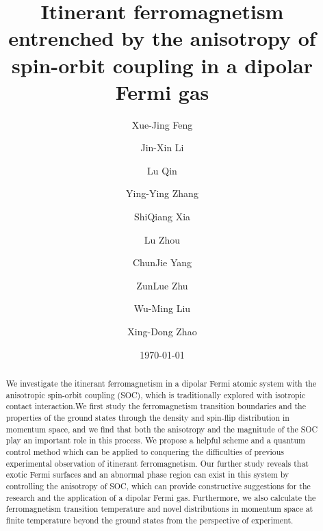\documentclass[twocolumn,english,pra,superscriptaddress]{revtex4-1}
\begin{document}
\title{\Large\textbf{Itinerant ferromagnetism entrenched by the anisotropy of spin-orbit coupling in a dipolar Fermi gas}}
\author{Xue-Jing Feng}
\author{Jin-Xin Li}
\author{Lu Qin}
\author{Ying-Ying Zhang}
\author{ShiQiang Xia}
\author{Lu Zhou}
\author{ChunJie Yang}
\author{ZunLue Zhu}
\author{Wu-Ming Liu}
\author{Xing-Dong Zhao}

\begin{abstract}
We investigate the itinerant ferromagnetism in a dipolar Fermi atomic system with the anisotropic spin-orbit coupling (SOC), which is traditionally explored with isotropic contact interaction.We first study the ferromagnetism transition boundaries and the properties of the ground states through the density and spin-flip distribution in momentum space, and we find that both the anisotropy and the magnitude of the SOC play an important role in this process. We propose a helpful scheme and a quantum control method which can be applied to conquering the difficulties of previous experimental observation of itinerant ferromagnetism. Our further study reveals that exotic Fermi surfaces and an abnormal phase region can exist in this system by controlling the anisotropy of SOC, which can provide constructive suggestions for the research and the application of a dipolar Fermi gas. Furthermore, we also calculate the ferromagnetism transition temperature and novel distributions in momentum space at finite temperature beyond the ground states from the perspective of experiment. \end{abstract}
\date{\today}
\maketitle
\end{document}
